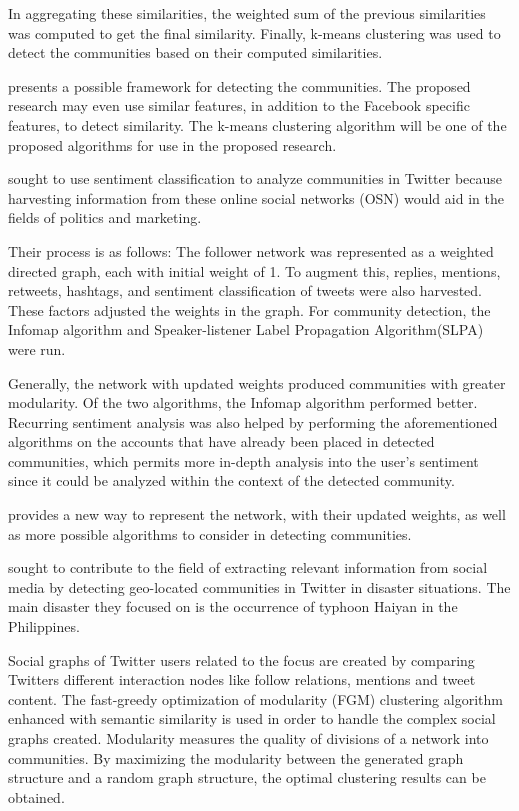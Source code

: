 In aggregating these similarities, the weighted sum of the previous similarities was computed to get the final similarity. Finally, k-means clustering was used to detect the communities based on their computed similarities. 

 presents a possible framework for detecting the communities. The proposed research may even use similar features, in addition to the Facebook specific features, to detect similarity. The k-means clustering algorithm will be one of the proposed algorithms for use in the proposed research.

 sought to use sentiment classification to analyze communities in Twitter because harvesting information from these online social networks (OSN) would aid in the fields of politics and marketing. 

Their process is as follows: The follower network was represented as a weighted directed graph, each with initial weight of 1. To augment this, replies, mentions, retweets, hashtags, and sentiment classification of tweets were also harvested. These factors adjusted the weights in the graph. For community detection, the Infomap algorithm and Speaker-listener Label Propagation Algorithm(SLPA) were run. 

Generally, the network with updated weights produced communities with greater modularity. Of the two algorithms, the Infomap algorithm performed better. Recurring sentiment analysis was also helped by performing the aforementioned algorithms on the accounts that have already been placed in detected communities, which permits more in-depth analysis into the user’s sentiment since it could be analyzed within the context of the detected community.

 provides a new way to represent the network, with their updated weights, as well as more possible algorithms to consider in detecting communities.

 sought to contribute to the field of extracting relevant information from social media by detecting geo-located communities in Twitter in disaster situations. The main disaster they focused on is the occurrence of typhoon Haiyan in the Philippines. 

Social graphs of Twitter users related to the focus are created by comparing Twitter\vtick s different interaction nodes like follow relations, mentions and tweet content. The fast-greedy optimization of modularity (FGM) clustering algorithm enhanced with semantic similarity is used in order to handle the complex social graphs created. Modularity measures the quality of divisions of a network into communities. By maximizing the modularity between the generated graph structure and a random graph structure, the optimal clustering results can be obtained. 

